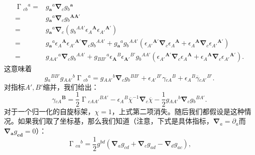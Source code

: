 \begin{equation*}
	\begin{aligned}
		\upGamma {_{cb}}^{a} = & g{_{\boldsymbol{a}}}^{a}\boldsymbol{\nabla }_{c} g{_{b}}^{\boldsymbol{a}}\\
		= & g{_{\boldsymbol{a}}}^{a}\boldsymbol{\nabla }_{c} g{_{b}}^{\boldsymbol{AA} '}\\
		= & g{_{\boldsymbol{a}}}^{a}\boldsymbol{\nabla }_{c} (g{_{b}}^{AA'} \epsilon {_{A}}^{\boldsymbol{A}} \epsilon {_{A'}}^{\boldsymbol{A} '} )\\
		= & g{_{\boldsymbol{a}}}^{a} \epsilon {_{A}}^{\boldsymbol{A}} \epsilon {_{A'}}^{\boldsymbol{A} '}\boldsymbol{\nabla }_{c} g{_{b}}^{AA'} +g{_{\boldsymbol{a}}}^{a} g{_{b}}^{AA'} (\epsilon {_{A'}}^{\boldsymbol{A} '}\boldsymbol{\nabla }_{c} \epsilon {_{A}}^{\boldsymbol{A}} +\epsilon {_{A}}^{\boldsymbol{A}}\boldsymbol{\nabla }_{c} \epsilon {_{A'}}^{\boldsymbol{A} '} )\\
		= & g{_{AA'}}^{a}\boldsymbol{\nabla }_{c} g{_{b}}^{AA'} +g{_{BB'}}^{a} \epsilon {_{\boldsymbol{A}}}^{B} \epsilon {_{\boldsymbol{A} '}}^{B'} g{_{b}}^{AA'} (\epsilon {_{A'}}^{\boldsymbol{A} '}\boldsymbol{\nabla }_{c} \epsilon {_{A}}^{\boldsymbol{A}} +\epsilon {_{A}}^{\boldsymbol{A}}\boldsymbol{\nabla }_{c} \epsilon {_{A'}}^{\boldsymbol{A} '} ).
	\end{aligned}
\end{equation*}
这意味着
\begin{equation}
	g{_{a}}^{BB'} g{_{AA'}}^{b} \upGamma {_{cb}}^{a} =g{_{AA'}}^{b}\boldsymbol{\nabla }_{c} g{_{b}}^{BB'} +\epsilon {_{A'}}^{B'} \gamma {_{cA}}^{B} +\epsilon {_{A}}^{B}\overline{\gamma }{_{cA'}}^{B'} .
	\label{eq:5.47}
\end{equation}
对指标$A',B'$缩并，我们给出：
\begin{equation}
	\gamma {_{cA}}^{\boldsymbol{B}} =\frac{1}{2} \upGamma {_{cAA'}}^{BA'} -\epsilon {_{A}}^{B}\overline{\chi }^{-1}\boldsymbol{\nabla }_{c}\overline{\chi } -\frac{1}{2} g{_{AA'}}^{b}\boldsymbol{\nabla }_{c} g{_{b}}^{BA'} .
	\label{eq:5.48}
\end{equation}
对于一个归一化的自旋标架，$\chi =1$，上式第二项消失。随后我们都假设是这种情况。如果我们取了坐标基，那么我们知道（注意，下式是具体指标，$\boldsymbol{\nabla }_{a} =\partial _{a}$而$\boldsymbol{\nabla }_{\boldsymbol{a}} g_{\boldsymbol{cd}} =0$）：
\begin{equation}
	\upGamma {_{ca}}^{b} =\frac{1}{2} g^{bd} (\boldsymbol{\nabla }_{a} g_{cd} +\boldsymbol{\nabla }_{c} g_{ad} -\boldsymbol{\nabla }_{d} g_{ac} ),
	\label{eq:5.49}
\end{equation}
